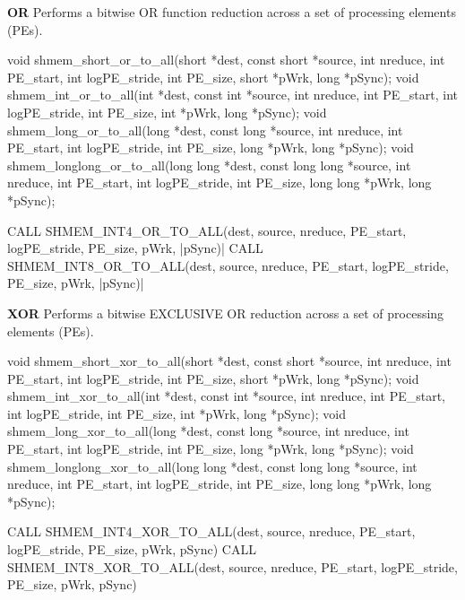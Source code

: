 \begin{apidefinition}
\bigskip
\textbf{OR} \newline
Performs  a  bitwise  OR  function reduction across a set of processing elements (\acp{PE}).\newline
\begin{Csynopsis}
void shmem_short_or_to_all(short *dest, const short *source, int nreduce, int PE_start, int logPE_stride, int PE_size, short *pWrk, long *pSync);
void shmem_int_or_to_all(int *dest, const int *source, int nreduce, int PE_start, int logPE_stride, int PE_size, int *pWrk, long *pSync);
void shmem_long_or_to_all(long *dest, const long *source, int nreduce, int PE_start, int logPE_stride, int PE_size, long *pWrk, long *pSync);
void shmem_longlong_or_to_all(long long *dest, const long long *source, int nreduce, int PE_start, int logPE_stride, int PE_size, long long *pWrk, long *pSync);
\end{Csynopsis}

\begin{Fsynopsis}
CALL SHMEM_INT4_OR_TO_ALL(dest, source, nreduce, PE_start, logPE_stride, PE_size, pWrk, |\mbox{pSync)}|
CALL SHMEM_INT8_OR_TO_ALL(dest, source, nreduce, PE_start, logPE_stride, PE_size, pWrk, |\mbox{pSync)}|	
\end{Fsynopsis}

\bigskip
\textbf{XOR}\newline
Performs  a  bitwise  EXCLUSIVE OR reduction across a set of processing elements (\acp{PE}).\newline
\begin{Csynopsis}
void shmem_short_xor_to_all(short *dest, const short *source, int nreduce, int PE_start, int logPE_stride, int PE_size, short *pWrk, long *pSync);
void shmem_int_xor_to_all(int *dest, const int *source, int nreduce, int PE_start, int logPE_stride, int PE_size, int *pWrk, long *pSync);
void shmem_long_xor_to_all(long *dest, const long *source, int nreduce, int PE_start, int logPE_stride, int PE_size, long *pWrk, long *pSync);
void shmem_longlong_xor_to_all(long long *dest, const long long *source, int nreduce, int PE_start, int logPE_stride, int PE_size, long long *pWrk, long *pSync);
\end{Csynopsis}

\begin{Fsynopsis}
CALL SHMEM_INT4_XOR_TO_ALL(dest, source, nreduce, PE_start, logPE_stride, PE_size, pWrk, pSync)
CALL SHMEM_INT8_XOR_TO_ALL(dest, source, nreduce, PE_start, logPE_stride, PE_size, pWrk, pSync)
\end{Fsynopsis}


\end{apidefinition}
